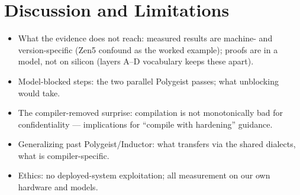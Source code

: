 \section{Discussion and Limitations}


\begin{itemize}
  \item What the evidence does not reach: measured results are machine- and
    version-specific (Zen5 confound as the worked example); proofs are in a
    model, not on silicon (layers A--D vocabulary keeps these apart).
  \item Model-blocked steps: the two parallel Polygeist passes; what
    unblocking would take.
  \item The compiler-removed surprise: compilation is not monotonically bad
    for confidentiality --- implications for ``compile with hardening''
    guidance.
  \item Generalizing past Polygeist/Inductor: what transfers via the shared
    dialects, what is compiler-specific.
  \item Ethics: no deployed-system exploitation; all measurement on our own
    hardware and models.
\end{itemize}
